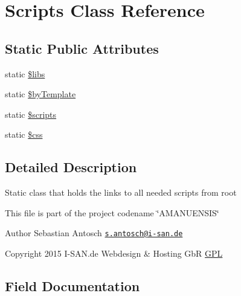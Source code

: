 \hypertarget{a00043}{}\section{Scripts Class Reference}
\label{a00043}
\subsection*{Static Public Attributes}
\begin{DoxyCompactItemize}
\item 
static \hyperlink{a00043_af921b61f4c24e9526d11cb2e6e274f80}{\$libs}
\item 
static \hyperlink{a00043_a22413c56163c8bf737718cd76a078b5c}{\$by\+Template}
\item 
static \hyperlink{a00043_ac1a0c3c8e4bbd9bc1a22d6147a839d75}{\$scripts}
\item 
static \hyperlink{a00043_ab2cede1cb181d8cd87d9a8f5570aa121}{\$css}
\end{DoxyCompactItemize}


\subsection{Detailed Description}
Static class that holds the links to all needed scripts from root

This file is part of the project codename \char`\"{}\+A\+M\+A\+N\+U\+E\+N\+S\+I\+S\char`\"{}

\begin{DoxyAuthor}{Author}
Sebastian Antosch \href{mailto:s.antosch@i-san.de}{\tt s.\+antosch@i-\/san.\+de} 
\end{DoxyAuthor}
\begin{DoxyCopyright}{Copyright}
2015 I-\/\+S\+A\+N.\+de Webdesign \& Hosting Gb\+R \hyperlink{}{G\+P\+L }
\end{DoxyCopyright}


\subsection{Field Documentation}
\hypertarget{a00043_af921b61f4c24e9526d11cb2e6e274f80}{}
